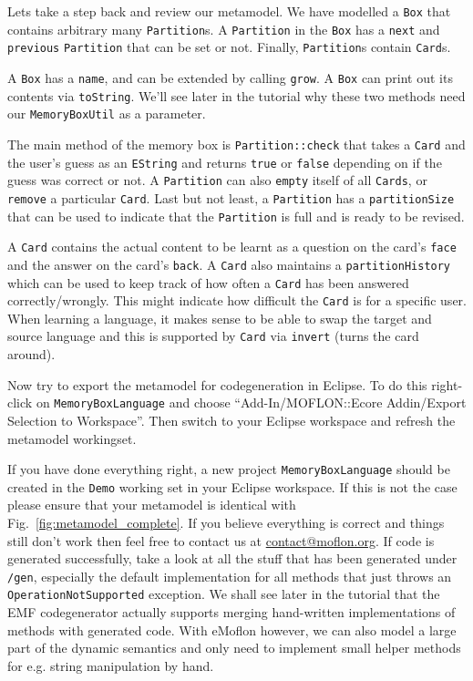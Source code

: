 Lets take a step back and review our metamodel.  We have modelled a \texttt{Box}
that contains arbitrary many \texttt{Partition}s.  A \texttt{Partition} in the
\texttt{Box} has a \texttt{next} and \texttt{previous} \texttt{Partition} that
can be set or not. Finally, \texttt{Partition}s contain \texttt{Card}s.

A \texttt{Box} has a \texttt{name}, and can be extended by calling
\texttt{grow}. A \texttt{Box} can print out its contents via \texttt{toString}. 
We'll see later in the tutorial why these two methods need our
\texttt{MemoryBoxUtil} as a parameter.

The main method of the memory box is \texttt{Partition::check} that takes a
\texttt{Card} and the user's guess as an \texttt{EString} and returns
\texttt{true} or \texttt{false} depending on if the guess was correct or not.
A \texttt{Partition} can also \texttt{empty} itself of all \texttt{Cards}, or
\texttt{remove} a particular \texttt{Card}.  Last but not least, a
\texttt{Partition} has a \texttt{partitionSize} that can be used to indicate
that the \texttt{Partition} is full and is ready to be revised.

\clearpage

A \texttt{Card} contains the actual content to be learnt as a question on the
card's \texttt{face} and the answer on the card's \texttt{back}. A \texttt{Card}
also maintains a \texttt{partition\-History} which can be used to keep track of
how often a \texttt{Card} has been answered correctly/wrongly.  This might
indicate how difficult the \texttt{Card} is for a specific user.
When learning a language, it makes sense to be able to swap the target and
source language and this is supported by \texttt{Card} via \texttt{invert}
(turns the card around).

Now try to export the metamodel for codegeneration in Eclipse.  To do this
right-click on \texttt{MemoryBoxLanguage} and choose ``Add-In/MOFLON::Ecore
Addin/Export Selection to Workspace''.  Then switch to your Eclipse work\-space
and refresh the metamodel workingset.

If you have done everything right, a new project \texttt{MemoryBoxLanguage}
should be created in the \texttt{Demo} working set in your Eclipse workspace.
If this is not the case please ensure that your metamodel is identical with
Fig.~\ref{fig:metamodel_complete}.  If you believe everything is correct and
things still don't work then feel free to contact us at
\href{mailto:contact@moflon.org}{contact@moflon.org}.  If code is generated
successfully, take a look at all the stuff that has been generated under
\texttt{/gen}, especially the default  implementation for all methods that just
throws an  \texttt{OperationNotSupported} exception.  We shall see later in the
tutorial  that the EMF codegenerator actually supports merging hand-written
implementations of methods with generated code.  With eMoflon however, we can
also model a large part of the dynamic semantics and only need to implement
small helper methods for e.g. string manipulation by hand.

